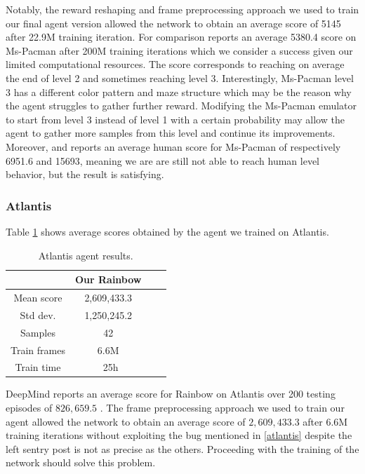 \documentclass[10pt,twocolumn,letterpaper]{article}
\begin{document}
Notably, the reward reshaping and frame preprocessing approach we used to train our final agent version allowed the network to obtain an average score of 5145 after 22.9M training iteration. For comparison \cite{DBLP:journals/corr/abs-1710-02298} reports an average 5380.4 score on Ms-Pacman after 200M training iterations which we consider a success given our limited computational resources.
The score corresponds to reaching on average the end of level 2 and sometimes reaching level 3. Interestingly, Ms-Pacman level 3 has a different color pattern and maze structure which may be the reason why the agent struggles to gather further reward. Modifying the Ms-Pacman emulator to start from level 3 instead of level 1 with a certain probability may allow the agent to gather more samples from this level and continue its improvements.
Moreover, \cite{DBLP:journals/corr/WangFL15} and \cite{humancontrol} reports an average human score for Ms-Pacman of respectively 6951.6 and 15693, meaning we are are still not able to reach human level behavior, but the result is satisfying.

\subsubsection{Atlantis}
Table \ref{tab:atlantis_results} shows average scores obtained by the agent we trained on Atlantis. 

\begin{table}
	\begin{center}
		\begin{tabular}{ |c|c|c|c| } 
			\hline
			& Our Rainbow \\ 
			\hline
			Mean score & 2,609,433.3 \\
			Std dev. & 1,250,245.2 \\
			Samples & 42 \\
			Train frames & 6.6M \\
			Train time & ~25h \\
			\hline
		\end{tabular}
	\end{center}
	\caption{Atlantis agent results.}
	\label{tab:atlantis_results}
\end{table}

DeepMind reports an average score for Rainbow on Atlantis over 200 testing episodes of $826,659.5$ \cite{DBLP:journals/corr/abs-1710-02298}. The frame preprocessing approach we used to train our agent allowed the network to obtain an average score of $2,609,433.3$ after $6.6$M training iterations without exploiting the bug mentioned in \ref{atlantis} despite the left sentry post is not as precise as the others.  Proceeding with the training of the network should solve this problem.
\end{document}
